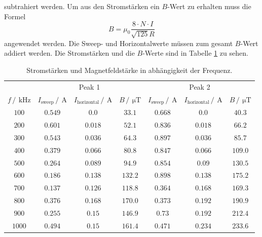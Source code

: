 subtrahiert werden. Um aus den Stromstärken ein $B$-Wert zu erhalten muss die Formel 
\begin{equation*}
  B=\mu_0\frac{8\cdot N \cdot I}{\sqrt{125}R}
\end{equation*}
angewendet werden. Die Sweep- und Horizontalwerte müssen zum gesamt $B$-Wert addiert werden. Die Stromstärken und die 
$B$-Werte sind in Tabelle \ref{tab:Messdaten} zu sehen.
\begin{table}
  \centering
  \caption{Stromstärken und Magnetfeldstärke in abhängigkeit der Frequenz.}
  \label{tab:Messdaten}
  \begin{tabular}{c c c c c c c}
    \toprule
    &\multicolumn{3}{c}{Peak 1}&\multicolumn{3}{c}{Peak 2}\\
    \cmidrule(lr){2-4}\cmidrule(lr){5-7}
    $f\,/\,\SI{}{\kilo\hertz}$&$I_{\text{sweep}}\,/\,\SI{}{\ampere}$&$I_{\text{horizontal}}\,/\,\SI{}{\ampere}$&$B\,/\,\SI{}{\micro\tesla}$&$I_{\text{sweep}}\,/\,\SI{}{\ampere}$&$I_{\text{horizontal}}\,/\,\SI{}{\ampere}$&$B\,/\,\SI{}{\micro\tesla}$\\
    \midrule
    $\num{100}$ &$\num{0.549}$&$\num{0.0}$  &$\num{33.1}$&$\num{0.668}$&$\num{0.0}$&$\num{40.3}$\\
    $\num{200}$ &$\num{0.601}$&$\num{0.018}$&$\num{52.1}$&$\num{0.836}$&$\num{0.018}$&$\num{66.2}$\\
    $\num{300}$ &$\num{0.543}$&$\num{0.036}$&$\num{64.3}$&$\num{0.897}$&$\num{0.036}$&$\num{85.7}$\\
    $\num{400}$ &$\num{0.379}$&$\num{0.066}$&$\num{80.8}$&$\num{0.847}$&$\num{0.066}$&$\num{109.0}$\\
    $\num{500}$ &$\num{0.264}$&$\num{0.089}$&$\num{94.9}$&$\num{0.854}$&$\num{0.09}$&$\num{130.5}$\\
    $\num{600}$ &$\num{0.186}$&$\num{0.138}$&$\num{132.2}$&$\num{0.898}$&$\num{0.138}$&$\num{175.2}$\\
    $\num{700}$ &$\num{0.137}$&$\num{0.126}$&$\num{118.8}$&$\num{0.364}$&$\num{0.168}$&$\num{169.3}$\\
    $\num{800}$ &$\num{0.376}$&$\num{0.168}$&$\num{170.0}$&$\num{0.373}$&$\num{0.192}$&$\num{190.9}$\\
    $\num{900}$ &$\num{0.255}$&$\num{0.15}$ &$\num{146.9}$&$\num{0.73}$&$\num{0.192}$&$\num{212.4}$\\
    $\num{1000}$&$\num{0.494}$&$\num{0.15}$ &$\num{161.4}$&$\num{0.471}$&$\num{0.234}$&$\num{233.6}$\\
    \bottomrule
  \end{tabular}
\end{table}
